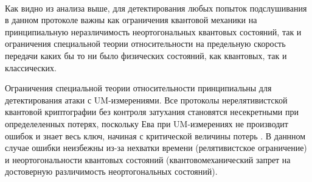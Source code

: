 \paragraph*{}
Как видно из анализа выше, для детектирования любых попыток подслушивания в данном протоколе важны как ограничения квантовой механики на принципиальную неразличимость неортогональных квантовых состояний, так и ограничения специальной теории относительности на предельную скорость передачи каких бы то ни было физических состояний, как квантовых, так и классических.

Ограничения специальной теории относительности принципиальны для детектирования атаки с UM-измерениями. Все протоколы нерелятивистской квантовой криптографии без контроля затухания становятся несекретными при определеленных потерях, поскольку Ева при UM-измерениях не производит ошибок и знает весь ключ, начиная с критической величины потерь \cite{scarani2009secpraquakeydis}. В даннном случае ошибки неизбежны из-за нехватки времени (релятивистское ограничение) и неортогональности квантовых состояний (квантовомеханический запрет на достоверную различимость неортогональных состояний).